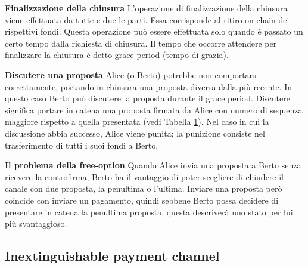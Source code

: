 \documentclass[12pt,italian,]{book}
\begin{document}
\textbf{\textbf{Finalizzazione della chiusura}} L'operazione di finalizzazione della chiusura viene effettuata da tutte e due le parti. Essa corrisponde al ritiro on-chain dei rispettivi fondi. Questa operazione può essere effettuata solo quando è passato un certo tempo dalla richiesta di chiusura. Il tempo che occorre attendere per finalizzare la chiusura è detto grace period (tempo di grazia).

\textbf{\textbf{Discutere una proposta}} Alice (o Berto) potrebbe non comportarsi correttamente, portando in chiusura una proposta diversa dalla più recente. In questo caso Berto può discutere la proposta durante il grace period. Discutere significa portare in catena una proposta firmata da Alice con numero di sequenza maggiore rispetto a quella presentata (vedi Tabella \protect\hyperlink{struct_propose}{1}). Nel caso in cui la discussione abbia successo, Alice viene punita; la punizione consiste nel trasferimento di tutti i suoi fondi a Berto.

\textbf{\textbf{Il problema della free-option}} Quando Alice invia una proposta a Berto senza ricevere la controfirma, Berto ha il vantaggio di poter scegliere di chiudere il canale con due proposta, la penultima o l'ultima. Inviare una proposta però coincide con inviare un pagamento, quindi sebbene Berto possa decidere di presentare in catena la penultima proposta, questa descriverà uno stato per lui più svantaggioso.

\hypertarget{inextinguishable-payment-channel}{%
\subsection{Inextinguishable payment channel}\label{inextinguishable-payment-channel}}
\end{document}
